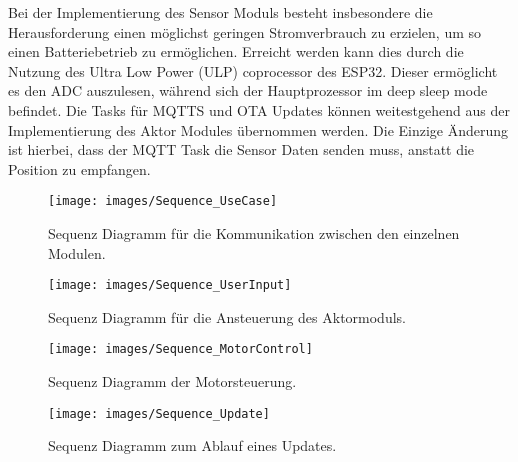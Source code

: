 Bei der Implementierung des Sensor Moduls besteht insbesondere die Herausforderung einen möglichst geringen Stromverbrauch zu erzielen, um so einen Batteriebetrieb zu ermöglichen. Erreicht werden kann dies durch die Nutzung des Ultra Low Power (ULP) coprocessor des ESP32. Dieser ermöglicht es den ADC auszulesen, während sich der Hauptprozessor im deep sleep mode befindet. Die Tasks für MQTTS und OTA Updates können weitestgehend aus der Implementierung des Aktor Modules übernommen werden. Die Einzige Änderung ist hierbei, dass der MQTT Task die Sensor Daten senden muss, anstatt die Position zu empfangen.

\begin{figure}[hbt]
	\centering
	\texttt{[image: images/Sequence\_UseCase]}
	\caption[Sequence UseCase]{Sequenz Diagramm für die Kommunikation zwischen den einzelnen Modulen.}
	\label{fig:Sequence_UseCase}
\end{figure}

\begin{figure}[hbt]
	\centering
	\texttt{[image: images/Sequence\_UserInput]}
	\caption[Sequence UserInput]{Sequenz Diagramm für die Ansteuerung des Aktormoduls.}
	\label{fig:Sequence_UserInput}
\end{figure}

\begin{figure}[hbt]
	\centering
	\texttt{[image: images/Sequence\_MotorControl]}
	\caption[Sequence Diagramm MotorControl]{Sequenz Diagramm der Motorsteuerung.}
	\label{fig:SequenceMotorControl}
\end{figure}

\begin{figure}[hbt]
	\centering
	\texttt{[image: images/Sequence\_Update]}
	\caption[Sequence Update]{Sequenz Diagramm zum Ablauf eines Updates.}
	\label{fig:Sequence_Update}
\end{figure}
